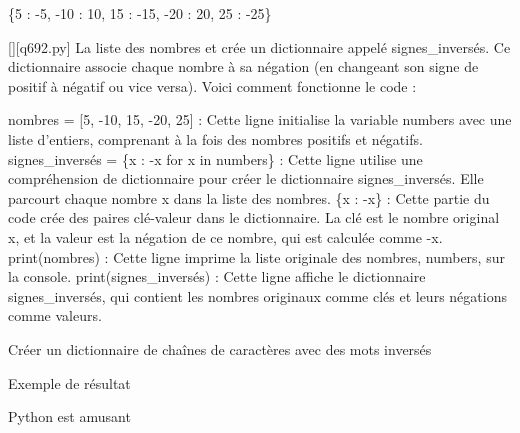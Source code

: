 \{5 : -5, -10 : 10, 15 : -15, -20 : 20, 25 : -25\}
        \par
        \begin{solution}
            \renewcommand{\nomfichier}{q692.py}
            \pythonfile{\chemincode \nomfichier}[][\nomfichier]
            La liste des nombres et crée un dictionnaire appelé signes\_inversés. Ce dictionnaire associe chaque nombre à sa négation (en changeant son signe de positif à négatif ou vice versa). Voici comment fonctionne le code :

    nombres = [5, -10, 15, -20, 25] : Cette ligne initialise la variable numbers avec une liste d'entiers, comprenant à la fois des nombres positifs et négatifs.
    signes\_inversés = \{x : -x for x in numbers\} : Cette ligne utilise une compréhension de dictionnaire pour créer le dictionnaire signes\_inversés. Elle parcourt chaque nombre x dans la liste des nombres.
        \{x : -x\} : Cette partie du code crée des paires clé-valeur dans le dictionnaire. La clé est le nombre original x, et la valeur est la négation de ce nombre, qui est calculée comme -x.
    print(nombres) : Cette ligne imprime la liste originale des nombres, numbers, sur la console.
    print(signes\_inversés) : Cette ligne affiche le dictionnaire signes\_inversés, qui contient les nombres originaux comme clés et leurs négations comme valeurs.
        \end{solution}
        

        \question
        Créer un dictionnaire de chaînes de caractères avec des mots inversés

Exemple de résultat

Python est amusant


